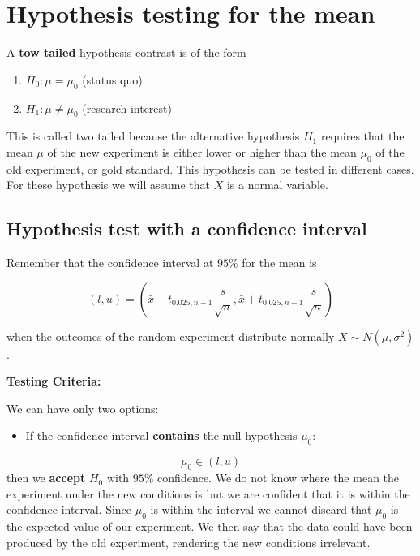 \documentclass[
]{book}
\providecommand{\tightlist}{%
  \setlength{\itemsep}{0pt}\setlength{\parskip}{0pt}}
\begin{document}
\hypertarget{hypothesis-testing-for-the-mean}{%
\section{Hypothesis testing for the mean}\label{hypothesis-testing-for-the-mean}}

A \textbf{tow tailed} hypothesis contrast is of the form

\begin{enumerate}
\def\labelenumi{\alph{enumi}.}
\tightlist
\item
  \(H_0:\mu = \mu_0\) (status quo)
\item
  \(H_1:\mu \neq \mu_0\) (research interest)
\end{enumerate}

This is called two tailed because the alternative hypothesis \(H_1\) requires that the mean \(\mu\) of the new experiment is either lower or higher than the mean \(\mu_0\) of the old experiment, or gold standard. This hypothesis can be tested in different cases. For these hypothesis we will assume that \(X\) is a normal variable.

\hypertarget{hypothesis-test-with-a-confidence-interval}{%
\subsection{Hypothesis test with a confidence interval}\label{hypothesis-test-with-a-confidence-interval}}

Remember that the confidence interval at \(95\%\) for the mean is

\[(l,u)=(\bar{x}-t_{0.025, n-1} \frac{s}{\sqrt{n}},\bar{x}+t_{0.025, n-1} \frac{s}{\sqrt{n}})\]

when the outcomes of the random experiment distribute normally \(X\sim N(\mu, \sigma^2)\).

\textbf{Testing Criteria:}

We can have only two options:

\begin{itemize}
\tightlist
\item
  If the confidence interval \textbf{contains} the null hypothesis \(\mu_0\):
\end{itemize}

\[\mu_0\in (l,u)\] then we \textbf{accept} \(H_0\) with \(95\%\) confidence. We do not know where the mean the experiment under the new conditions is but we are confident that it is within the confidence interval. Since \(\mu_0\) is within the interval we cannot discard that \(\mu_0\) is the expected value of our experiment. We then say that the data could have been produced by the old experiment, rendering the new conditions irrelevant.
\end{document}

